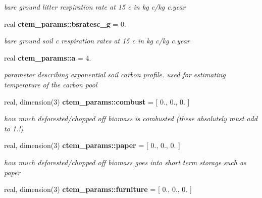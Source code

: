 \begin{DoxyCompactItemize}
\begin{DoxyCompactList}\small\item\em bare ground litter respiration rate at 15 c in kg c/kg c.\+year \end{DoxyCompactList}\item 
\hypertarget{namespacectem__params_a3b130e3b7506998094c8650ea4d26ff7}{}real {\bfseries ctem\+\_\+params\+::bsratesc\+\_\+g} = 0.\label{namespacectem__params_a3b130e3b7506998094c8650ea4d26ff7}

\begin{DoxyCompactList}\small\item\em bare ground soil c respiration rates at 15 c in kg c/kg c.\+year \end{DoxyCompactList}\item 
\hypertarget{namespacectem__params_a8822a85e4e8060308fbdb71f7983e926}{}real {\bfseries ctem\+\_\+params\+::a} = 4.\label{namespacectem__params_a8822a85e4e8060308fbdb71f7983e926}

\begin{DoxyCompactList}\small\item\em parameter describing exponential soil carbon profile. used for estimating temperature of the carbon pool \end{DoxyCompactList}\item 
\hypertarget{namespacectem__params_aa754be19830b01b24a5a992122c67f6f}{}real, dimension(3) {\bfseries ctem\+\_\+params\+::combust} = \mbox{[} 0., 0., 0. \mbox{]}\label{namespacectem__params_aa754be19830b01b24a5a992122c67f6f}

\begin{DoxyCompactList}\small\item\em how much deforested/chopped off biomass is combusted (these absolutely must add to 1.!) \end{DoxyCompactList}\item 
\hypertarget{namespacectem__params_a39b15413313f38228e1c02dbd0d672f3}{}real, dimension(3) {\bfseries ctem\+\_\+params\+::paper} = \mbox{[} 0., 0., 0. \mbox{]}\label{namespacectem__params_a39b15413313f38228e1c02dbd0d672f3}

\begin{DoxyCompactList}\small\item\em how much deforested/chopped off biomass goes into short term storage such as paper \end{DoxyCompactList}\item 
\hypertarget{namespacectem__params_afde8cda60ab64e6f3699c990584b5aaf}{}real, dimension(3) {\bfseries ctem\+\_\+params\+::furniture} = \mbox{[} 0., 0., 0. \mbox{]}\label{namespacectem__params_afde8cda60ab64e6f3699c990584b5aaf}


\end{DoxyCompactItemize}
